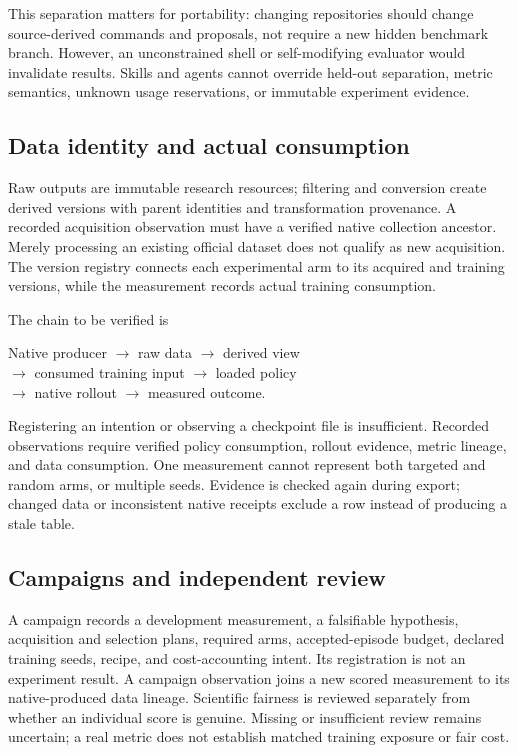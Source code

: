\documentclass[10pt,twocolumn,letterpaper]{article}
\begin{document}
This separation matters for portability: changing repositories should change
source-derived commands and proposals, not require a new hidden benchmark branch.
However, an unconstrained shell or self-modifying evaluator would invalidate
results. Skills and agents cannot override held-out separation, metric semantics,
unknown usage reservations, or immutable experiment evidence.

\subsection{Data identity and actual consumption}
Raw outputs are immutable research resources; filtering and conversion create
derived versions with parent identities and transformation provenance. A recorded
acquisition observation must have a verified native collection ancestor. Merely
processing an existing official dataset does not qualify as new acquisition.
The version registry connects each experimental arm to its acquired and training
versions, while the measurement records actual training consumption.

The chain to be verified is
\begin{center}
\small Native producer $\rightarrow$ raw data $\rightarrow$ derived view\\
$\rightarrow$ consumed training input $\rightarrow$ loaded policy\\
$\rightarrow$ native rollout $\rightarrow$ measured outcome.
\end{center}
Registering an intention or observing a checkpoint file is insufficient. Recorded
observations require verified policy consumption, rollout evidence, metric lineage,
and data consumption. One measurement cannot represent both targeted and random
arms, or multiple seeds. Evidence is checked again during export; changed data or
inconsistent native receipts exclude a row instead of producing a stale table.

\subsection{Campaigns and independent review}
A campaign records a development measurement, a falsifiable hypothesis,
acquisition and selection plans, required arms, accepted-episode budget, declared
training seeds, recipe, and cost-accounting intent. Its registration is not an
experiment result. A campaign observation joins a new scored measurement to its
native-produced data lineage. Scientific fairness is reviewed separately from
whether an individual score is genuine. Missing or insufficient review remains
uncertain; a real metric does not establish matched training exposure or fair cost.
\end{document}
